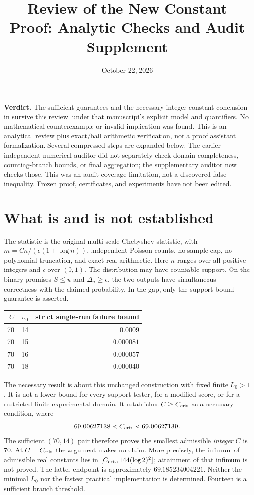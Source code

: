 \documentclass[10pt]{article}
\title{Review of the New Constant Proof: Analytic Checks and Audit Supplement}
\author{}\date{October 22, 2026}
\begin{document}
\maketitle

\noindent\textbf{Verdict.} The sufficient guarantees and the necessary integer
constant conclusion in  survive
this review, under that manuscript's explicit model and quantifiers.
No mathematical counterexample or invalid implication was found. This is
an analytical review plus exact/ball arithmetic verification, not a proof
assistant formalization. Several compressed steps are expanded below.
The earlier independent numerical auditor did not separately check domain
completeness, counting-branch bounds, or final aggregation; the supplementary
auditor now checks those. This was an audit-coverage limitation, not a
discovered false inequality. Frozen proof, certificates, and experiments
have not been edited.

\section{What is and is not established}
The statistic is the original multi-scale Chebyshev statistic, with
$m=Cn/(\epsilon(1+\log n))$, independent Poisson counts, no sample cap,
no polynomial truncation, and exact real arithmetic. Here $n$ ranges over
all positive integers and $\epsilon$ over $(0,1)$. The distribution may
have countable support. On the binary promises $S\le n$ and
$\Delta_n\ge\epsilon$, the two outputs have simultaneous correctness
with the claimed probability. In the gap, only the support-bound guarantee
is asserted.

\begin{center}
\begin{tabular}{rrr}
\toprule $C$ & $L_0$ & strict single-run failure bound\\\midrule
70&14&$0.0009$\\
70&15&$0.000081$\\
70&16&$0.000057$\\
70&18&$0.000040$\\\bottomrule
\end{tabular}
\end{center}
The necessary result is about this unchanged construction with fixed
finite $L_0>1$. It is not a lower bound for every support tester, for a
modified score, or for a restricted finite experimental domain.
It establishes $C\ge C_{\rm crit}$ as a necessary condition, where
\[
69.00627138<C_{\rm crit}<69.00627139.
\]
The sufficient $(70,14)$ pair therefore proves the smallest admissible
\emph{integer} $C$ is 70. At $C=C_{\rm crit}$ the argument makes no
claim. More precisely, the infimum of admissible real constants lies in
$[C_{\rm crit},144(\log2)^2]$; attainment of that infimum is not proved.
The latter endpoint is approximately $69.185234004221$.
Neither the minimal $L_0$ nor the fastest practical implementation is
determined. Fourteen is a sufficient branch threshold.
\end{document}
